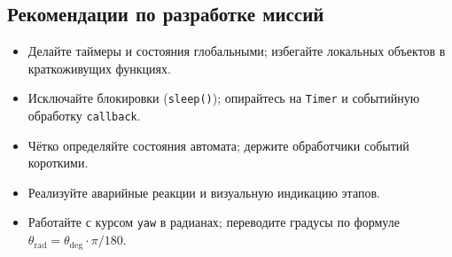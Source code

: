 \subsection{Рекомендации по разработке миссий}
\begin{itemize}
  \item Делайте таймеры и состояния глобальными; избегайте локальных объектов в краткоживущих функциях.
  \item Исключайте блокировки (\texttt{sleep()}); опирайтесь на \texttt{Timer} и событийную обработку \texttt{callback}.
  \item Чётко определяйте состояния автомата; держите обработчики событий короткими.
  \item Реализуйте аварийные реакции и визуальную индикацию этапов.
  \item Работайте с курсом \texttt{yaw} в радианах; переводите градусы по формуле \(\theta_{\mathrm{rad}}=\theta_{\mathrm{deg}}\cdot\pi/180\).
\end{itemize}
